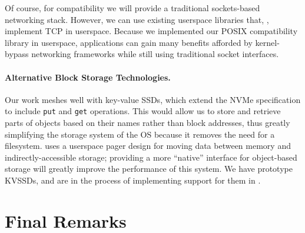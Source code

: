 {    Of course, for compatibility we will provide a traditional sockets-based networking stack. However,
    we can use existing userspace libraries that, \eg, implement TCP in userspace.
    Because we implemented our POSIX compatibility library in userspace, applications can gain many
    benefits afforded by kernel-bypass networking frameworks while still using traditional socket
    interfaces.


    \paragraph{Alternative Block Storage Technologies.}

    Our work meshes well with key-value SSDs, which extend the NVMe
    specification to include \texttt{put} and \texttt{get} operations. This would allow us to store and
    retrieve parts of objects based on their names rather than block addresses, thus greatly
    simplifying the storage system of the OS because it removes the need for a filesystem. \Twizzler
    uses a userspace pager design for moving data between memory and indirectly-accessible storage;
    providing a more ``native'' interface for object-based storage will greatly improve the performance
    of this system. We have prototype KVSSDs, and are in the process of implementing support for them in
    \Twizzler.

}


\section{Final Remarks}

